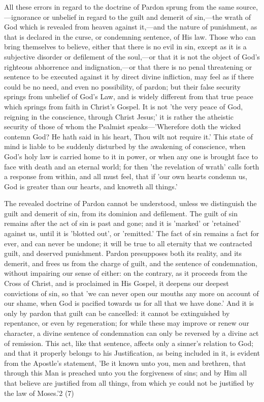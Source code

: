 \documentclass[
]{book}
\begin{document}
All these errors in regard to the doctrine of Pardon sprung from the same source,---ignorance or unbelief in regard to the guilt and demerit of sin,---the wrath of God which is revealed from heaven against it,---and the nature of punishment, as that is declared in the curse, or condemning sentence, of His law. Those who can bring themselves to believe, either that there is no evil in sin, except as it is a subjective disorder or defilement of the soul,---or that it is not the object of God's righteous abhorrence and indignation,---or that there is no penal threatening or sentence to be executed against it by direct divine infliction, may feel as if there could be no need, and even no possibility, of pardon; but their false security springs from unbelief of God's Law, and is widely different from that true peace which springs from faith in Christ's Gospel. It is not 'the very peace of God, reigning in the conscience, through Christ Jesus;' it is rather the atheistic security of those of whom the Psalmist speaks---'Wherefore doth the wicked contemn God? He hath said in his heart, Thou wilt not require it.' This state of mind is liable to be suddenly disturbed by the awakening of conscience, when God's holy law is carried home to it in power, or when any one is brought face to face with death and an eternal world; for then 'the revelation of wrath' calls forth a response from within, and all must feel, that if 'our own hearts condemn us, God is greater than our hearts, and knoweth all things.'

The revealed doctrine of Pardon cannot be understood, unless we distinguish the guilt and demerit of sin, from its dominion and defilement. The guilt of sin remains after the act of sin is past and gone; and it is 'marked' or 'retained' against us, until it is 'blotted out', or 'remitted.' The fact of sin remains a fact for ever, and can never be undone; it will be true to all eternity that we contracted guilt, and deserved punishment. Pardon presupposes both its reality, and its demerit, and frees us from the charge of guilt, and the sentence of condemnation, without impairing our sense of either: on the contrary, as it proceeds from the Cross of Christ, and is proclaimed in His Gospel, it deepens our deepest convictions of sin, so that 'we can never open our mouths any more on account of our shame, when God is pacified towards us for all that we have done.' And it is only by pardon that guilt can be cancelled: it cannot be extinguished by repentance, or even by regeneration; for while these may improve or renew our character, a divine sentence of condemnation can only be reversed by a divine act of remission. This act, like that sentence, affects only a sinner's relation to God; and that it properly belongs to his Justification, as being included in it, is evident from the Apostle's statement, 'Be it known unto you, men and brethren, that through this Man is preached unto you the forgiveness of sins; and by Him all that believe are justified from all things, from which ye could not be justified by the law of Moses.'2 (7)
\end{document}

